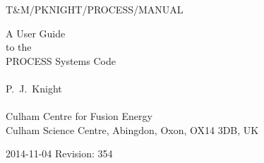 \documentclass[11pt,a4paper]{report}
\newcommand{\version}{
2014-11-04
\hfill
Revision: 354
}
\begin{document}
\footnotesize
\hfill T\&M/PKNIGHT/PROCESS/MANUAL

\vspace*{4cm}
\begin{center}
\Huge A User Guide\\ to the \\ PROCESS Systems Code\\
~\\ \LARGE P.\ J.\ Knight\\
~\\ \Large Culham Centre for Fusion Energy\\
Culham Science Centre, Abingdon, Oxon, OX14 3DB, UK
\end{center}

\vfill
\footnotesize
\version
\normalsize

\tableofcontents

\listoffigures

\listoftables

%  
%  
%  
%  
%  
%  

\end{document}
